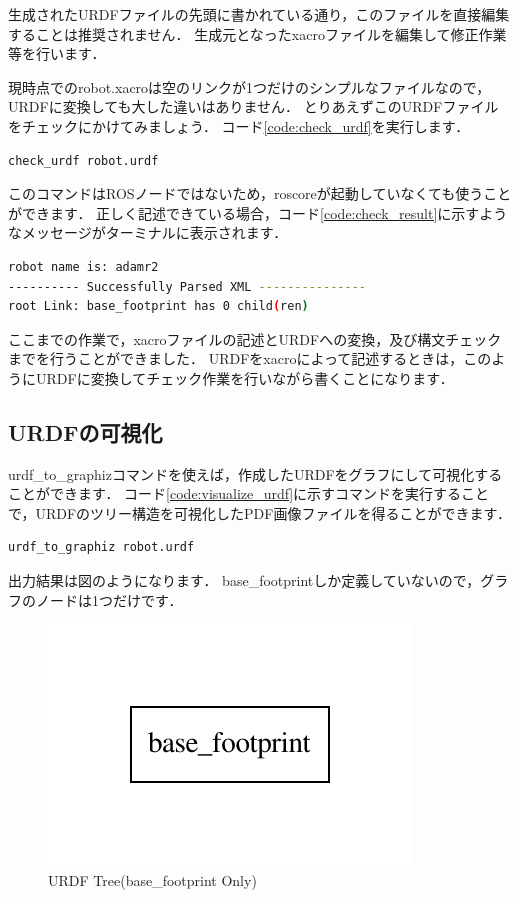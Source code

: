 \documentclass[{../../master}]{subfiles}
\begin{document}
生成されたURDFファイルの先頭に書かれている通り，このファイルを直接編集することは推奨されません．
生成元となった\textsf{xacro}ファイルを編集して修正作業等を行います．

現時点での\textsf{robot.xacro}は空のリンクが1つだけのシンプルなファイルなので，URDFに変換しても大した違いはありません．
とりあえずこのURDFファイルをチェックにかけてみましょう．
コード\ref{code:check_urdf}を実行します．

\begin{lstlisting}[language=sh, caption=Check URDF, label=code:check_urdf]
check_urdf robot.urdf
\end{lstlisting}

このコマンドはROSノードではないため，\textsf{roscore}が起動していなくても使うことができます．
正しく記述できている場合，コード\ref{code:check_result}に示すようなメッセージがターミナルに表示されます．

\begin{lstlisting}[language=sh, caption=Check Result, label=code:check_result]
robot name is: adamr2
---------- Successfully Parsed XML ---------------
root Link: base_footprint has 0 child(ren)
\end{lstlisting}

ここまでの作業で，\textsf{xacro}ファイルの記述とURDFへの変換，及び構文チェックまでを行うことができました．
URDFを\textsf{xacro}によって記述するときは，このようにURDFに変換してチェック作業を行いながら書くことになります．

\subsection{URDFの可視化}

\textsf{urdf_to_graphiz}コマンドを使えば，作成したURDFをグラフにして可視化することができます．
コード\ref{code:visualize_urdf}に示すコマンドを実行することで，URDFのツリー構造を可視化したPDF画像ファイルを得ることができます．

\begin{lstlisting}[language=sh, caption=Visualize URDF Tree, label=code:visualize_urdf]
urdf_to_graphiz robot.urdf
\end{lstlisting}

出力結果は図のようになります．
\textsf{base_footprint}しか定義していないので，グラフのノードは1つだけです．

\begin{figure}[ht]
  \centering
  \includegraphics[width=70truemm, clip]{images/urdf_graph_only_base_footprint.pdf}
  \caption{URDF Tree(\textsf{base_footprint} Only)}
  \label{fig:urdf_graph_only_base_footprint}
\end{figure}
\end{document}

